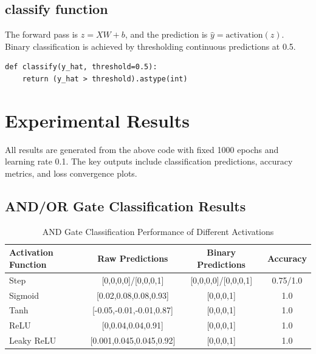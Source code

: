 \documentclass[11pt]{article}
\begin{document}
\subsection{classify function}
The forward pass is $z = XW + b$, and the prediction is $\hat{y} = \text{activation}(z)$. 
Binary classification is achieved by thresholding continuous predictions at 0.5.
\begin{lstlisting}[caption={classify function}]
def classify(y_hat, threshold=0.5):
    return (y_hat > threshold).astype(int)
\end{lstlisting}

\section{Experimental Results}
All results are generated from the above code with fixed 1000 epochs and learning rate 0.1. 
The key outputs include classification predictions, accuracy metrics, and loss convergence plots.

\subsection{AND/OR Gate Classification Results}
\begin{table}[h!]
\centering
\caption{AND Gate Classification Performance of Different Activations}
\begin{tabular}{@{}lccc@{}}
\toprule
Activation Function & Raw Predictions & Binary Predictions & Accuracy \\ \midrule
Step                & [0,0,0,0]/[0,0,0,1] & [0,0,0,0]/[0,0,0,1] & 0.75/1.0 \\
Sigmoid             & [0.02,0.08,0.08,0.93] & [0,0,0,1] & 1.0 \\
Tanh                & [-0.05,-0.01,-0.01,0.87] & [0,0,0,1] & 1.0 \\
ReLU                & [0,0.04,0.04,0.91] & [0,0,0,1] & 1.0 \\
Leaky ReLU          & [0.001,0.045,0.045,0.92] & [0,0,0,1] & 1.0 \\ \bottomrule
\end{tabular}
\label{tab:and_result}
\end{table}
\end{document}
